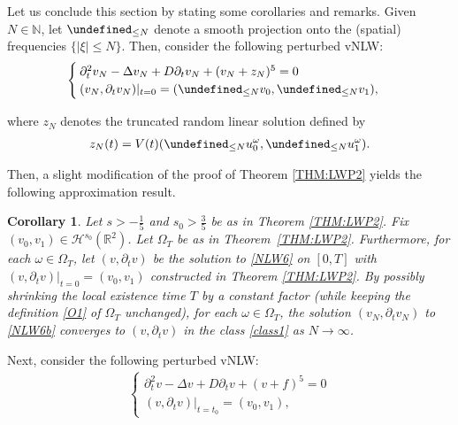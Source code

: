\documentclass[letterpaper, 11pt,  reqno]{amsart}
\newtheorem{corollary}[theorem]{Corollary}
\newcommand{\1}{\hspace{0.5mm}\text{I}\hspace{0.2mm}}
\newcommand{\noi}{\noindent}
\newcommand{\R}{\mathbb{R}}
\let\P= \undefined
\newcommand{\P}{\mathbf{P}}
\newcommand{\Dl}{\Delta}
\newcommand{\dt}{\partial_t}
\renewcommand{\o}{\omega}
\renewcommand{\O}{\Omega}
\newcommand{\N}{\mathbb{N}}
\renewcommand{\H}{\mathcal{H}}
\numberwithin{equation}{section}
\numberwithin{theorem}{section}
\begin{document}
\medskip




Let us conclude this section by stating some corollaries
and remarks.
Given $N \in \N$, let $\P_{\le N}$ denote
a smooth projection onto the (spatial) frequencies $\{|\xi|\leq  N\}$.
Then, consider the following perturbed vNLW:
\begin{align}
\begin{cases}
\dt^2 v_N  -  \Dl  v_N  + D \dt v_N  + (v_N + z_N)^5 =0\\
(v_N, \dt v_N) |_{t = 0} = (\P_{\le N}v_0, \P_{\le N}v_1), 
\end{cases}
\label{NLW6b}
\end{align}

\noi
where $z_N$ denotes
the truncated random linear solution defined by 
\begin{align*}
z_N(t) = V(t) (\P_{\le N}u_0^\o, \P_{\le N}u_1^\o).
\end{align*}


\noi
Then, a slight modification of the proof of Theorem \ref{THM:LWP2} yields
the following approximation result.


\begin{corollary}\label{COR:LWP3}
Let $s > -\frac 15$
and $s_0 > \frac 35$ be as in Theorem \ref{THM:LWP2}.
Fix $(v_0, v_1) \in \H^{s_0}(\R^2)$.
Let $\O_T$ be as in Theorem~\ref{THM:LWP2}.
Furthermore, for each $\o \in \O_T$, let  
 $(v, \dt v)$ 
be the solution to \eqref{NLW6} on $[0, T]$
with $(v, \dt v) |_{t = 0} = (v_0, v_1)$
constructed in Theorem \ref{THM:LWP2}.
By possibly shrinking the local existence time $T$
by a constant factor \textup{(}while keeping 
the definition \eqref{O1} of $\O_T$ unchanged\textup{)}, 
for each $\o \in \O_T$, 
the solution  
 $(v_N, \dt v_N)$ 
 to \eqref{NLW6b}
converges to $(v, \dt v)$ in the class \eqref{class1}
as $N \to \infty$.

\end{corollary}






Next, consider the 
following perturbed vNLW:
\begin{align}
\begin{cases}
\dt^2 v  -  \Dl  v  + D \dt v  + (v + f)^5 =0\\
(v, \dt v) |_{t = t_0} = (v_0, v_1), 
\end{cases}
\label{NLW6a}
\end{align}
\end{document}
